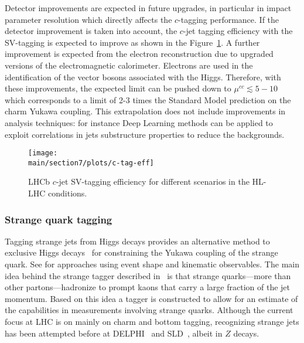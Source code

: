 \documentclass[../report.tex]{subfiles}
\providecommand{\main}{..}
\begin{document}
Detector improvements are expected in future upgrades, in particular in impact parameter resolution which directly affects the $c$-tagging performance. 
If the detector improvement is taken into account, the $c$-jet tagging efficiency with the SV-tagging is expected to  improve as shown in the Figure~\ref{fig:c-tag-eff}.  
A further improvement is expected from the electron reconstruction due to upgraded versions of the electromagnetic calorimeter. Electrons are used in the identification of the vector bosons associated with the Higgs.
Therefore, with these improvements, the expected limit can be pushed down to $\mu^{cc}\lesssim 5-10$ which corresponds to a limit of 2-3 times the Standard Model prediction on the charm Yukawa coupling.
This extrapolation does not include improvements in analysis techniques: for instance  Deep Learning methods can be applied to exploit correlations in  jets substructure properties to reduce the backgrounds.


\begin{figure}[ht]
	\centering
	\texttt{[image: \\main/section7/plots/c-tag-eff]}
	\caption{LHCb $c$-jet SV-tagging efficiency for different scenarios in the HL-LHC conditions.}
	\label{fig:c-tag-eff}
\end{figure}

\FloatBarrier

\subsubsection{Strange quark tagging}
\label{sec:strange-tagging}

Tagging strange jets from Higgs decays provides an alternative method to exclusive Higgs decays~\cite{Kagan:2014ila, Perez:2015lra, Koenig:2015pha, Aaboud:2016rug, Aaboud:2017xnb,Alte:2016yuw} for constraining the Yukawa coupling of the strange quark. See  for approaches using event shape and kinematic
observables. The main idea behind the strange tagger described in~ is that
strange quarks---more than other partons---hadronize to prompt kaons that carry a large fraction of the jet momentum. Based on this idea a tagger is constructed to allow for an estimate of the
capabilities in measurements involving strange quarks. Although the current focus at LHC is on
mainly on charm and bottom tagging, recognizing strange jets has been attempted before at
DELPHI~\cite{Boudinov:1998fao} and SLD~\cite{Kalelkar:2000ig}, albeit in $Z$ decays.
\end{document}
